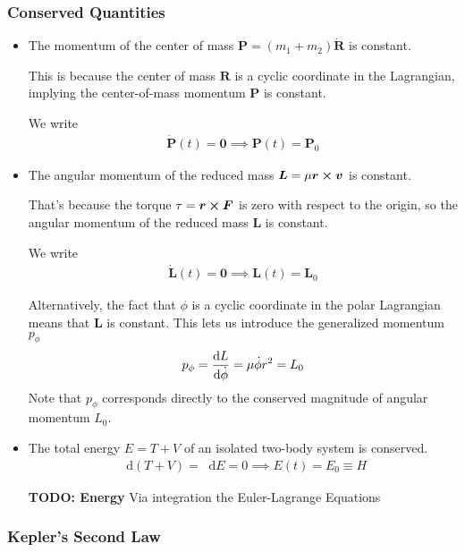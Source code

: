 \documentclass[11pt, a4paper]{article}
\newcommand{\diff}{\mathop{}\!\mathrm{d}} %
\begin{document}
\subsubsection{Conserved Quantities}
\begin{itemize}
	\item The  momentum of the center of mass $ \bm{P} = (m_1 + m_2) \dot{\bm{R}}  $ is constant. 
	
	This is because the center of mass $ \bm{R} $ is a cyclic coordinate in the Lagrangian, implying the center-of-mass momentum $ \bm{P} $ is constant. 
	
	We write
	\begin{align*}
		\dot{\bm{P}}(t) = \bm{0} \implies \bm{P}(t) = \bm{P}_0
	\end{align*}

	\item The angular momentum of the reduced mass $ \bm{L} = \mu \bm{r} \cross \bm{v} $ is constant. 
	

	That's because the torque $ \tau = \bm{r} \cross \bm{F} $ is zero with respect to the origin, so the angular momentum of the reduced mass $ \bm{L} $ is constant. 

	We write
	\begin{align*}
		\dot{\bm{L}}(t) = \bm{0} \implies \bm{L}(t) = \bm{L}_0
	\end{align*}


	Alternatively, the fact that $ \phi $ is a cyclic coordinate in the polar Lagrangian means that $ \bm{L} $ is constant. This lets us introduce the generalized momentum $ p_{\phi} $
	\begin{align*}
		p_{\phi} = \dv{L}{\dot{\phi}} = \mu \dot{\phi} r^2 = L_0
	\end{align*}
	Note that $ p_{\phi} $ corresponds directly to the conserved magnitude of angular momentum $ L_0 $.


	\item The total energy $ E = T + V $ of an isolated two-body system is conserved. 
	\begin{align*}
		\diff (T + V) = \diff E = 0 \implies E(t) = E_0 \equiv H
	\end{align*}
	
	 \textbf{TODO: Energy} Via integration the Euler-Lagrange Equations
	
\end{itemize}


\subsubsection{Kepler's Second Law}
\end{document}
